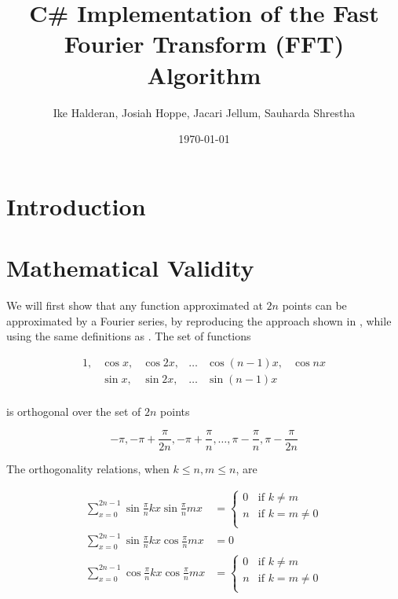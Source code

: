 \documentclass[11pt]{article}
\title{C\# Implementation of the Fast Fourier Transform (FFT) Algorithm}
\author{Ike Halderan, Josiah Hoppe, Jacari Jellum, Sauharda Shrestha}
\date{\today}
\begin{document}
\maketitle


\section*{Introduction}

\section*{Mathematical Validity}
We will first show that any function approximated at $2n$ points can be approximated by a Fourier series, by reproducing the approach shown in \cite{hamming}, while using the same definitions as \cite{textbook}. The set of functions 

\[\begin{array}{cccccc}
    1, & \cos x, & \cos 2x, & \ldots & \cos \left(n-1\right)x,& \cos nx \\
    {}&\sin x, & \sin 2x, & \ldots & \sin \left(n-1\right)x & \\    
\end{array}\]


is orthogonal over the set of $2n$ points  

\[-\pi, -\pi + \frac{\pi}{2n}, -\pi + \frac{\pi}{n}, \ldots, \pi - \frac{\pi}{n},\pi - \frac{\pi}{2n}\]

The orthogonality relations, when $k \leq n, m \leq n$, are

\begin{align}
    \sum_{x=0}^{2n-1} \sin \frac{\pi}{n}kx \sin \frac{\pi}{n}mx & = \begin{cases}
        0 & \text{if } k \neq m \\
        n & \text{if } k = m \neq 0 \\        
    \end{cases} \label{ortho sine sine}\\
    \sum_{x=0}^{2n-1} \sin \frac{\pi}{n}kx \cos \frac{\pi}{n}mx & = 0 \label{ortho sine cosine}\\
    \sum_{x=0}^{2n-1} \cos \frac{\pi}{n}kx \cos \frac{\pi}{n}mx & = \begin{cases}
        0 & \text{if } k \neq m \\
        n & \text{if } k = m \neq 0 \\
    \end{cases} \label{ortho cosine cosine}
\end{align}
\end{document}

